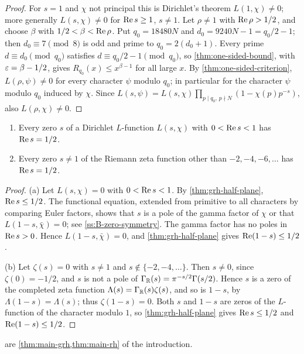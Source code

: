 \begin{proof}
For $s=1$ and $\chi$ not principal this is Dirichlet's theorem $L(1,\chi)\ne0$; more generally
$L(s,\chi)\neq0$ for $\operatorname{Re} s\ge1$, $s\ne1$. Let $\rho\ne1$ with $\operatorname{Re}\rho>1/2$, and choose $\beta$ with
$1/2<\beta<\operatorname{Re}\rho$. Put $q_0=18480N$ and $d_0=9240N-1=q_0/2-1$; then $d_0\equiv7\pmod8$ is odd and
prime to $q_0=2(d_0+1)$. Every prime $d\equiv d_0\pmod{q_0}$ satisfies $d\equiv q_0/2-1\pmod{q_0}$,
so \cref{thm:one-sided-bound}, with $\varepsilon=\beta-1/2$, gives $R_{q_0}(x)\le x^{\beta-1}$ for all large
$x$. By \cref{thm:one-sided-criterion}, $L(\rho,\psi)\ne0$ for every character $\psi$ modulo $q_0$; in
particular for the character $\psi$ modulo $q_0$ induced by $\chi$. Since
$L(s,\psi)=L(s,\chi)\prod_{p\mid q_0,\,p\nmid N}(1-\chi(p)p^{-s})$, also $L(\rho,\chi)\neq0$.
\end{proof}

\begin{theorem}\label{thm:zeros-on-line}
\begin{enumerate}[label=\textup{(\alph*)}]
\item Every zero $s$ of a Dirichlet $L$-function $L(s,\chi)$ with $0<\operatorname{Re} s<1$ has $\operatorname{Re} s=1/2$.
\item Every zero $s\neq1$ of the Riemann zeta function other than $-2,-4,-6,\dots$ has $\operatorname{Re} s=1/2$.
\end{enumerate}
\end{theorem}

\begin{proof}
(a) Let $L(s,\chi)=0$ with $0<\operatorname{Re} s<1$. By \cref{thm:grh-half-plane}, $\operatorname{Re} s\le1/2$. The functional
equation, extended from primitive to all characters by comparing Euler factors, shows that $s$ is a
pole of the gamma factor of $\chi$ or that $L(1-s,\bar\chi)=0$; see \cref{ss:B-zero-symmetry}. The
gamma factor has no poles in $\operatorname{Re} s>0$. Hence $L(1-s,\bar\chi)=0$, and \cref{thm:grh-half-plane} gives
$\operatorname{Re}(1-s)\le1/2$.

(b) Let $\zeta(s)=0$ with $s\ne1$ and $s\notin\{-2,-4,\dots\}$. Then $s\ne0$, since $\zeta(0)=-1/2$,
and $s$ is not a pole of $\Gamma_{\mathbb{R}}(s)=\pi^{-s/2}\Gamma(s/2)$. Hence $s$ is a zero of the completed
zeta function $\Lambda(s)=\Gamma_{\mathbb{R}}(s)\zeta(s)$, and so is $1-s$, by $\Lambda(1-s)=\Lambda(s)$; thus
$\zeta(1-s)=0$. Both $s$ and $1-s$ are zeros of the $L$-function of the character modulo $1$, so
\cref{thm:grh-half-plane} gives $\operatorname{Re} s\le1/2$ and $\operatorname{Re}(1-s)\le1/2$.
\end{proof}

 are \cref{thm:main-grh,thm:main-rh} of the
introduction.
